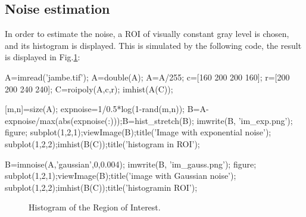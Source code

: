 \subsection{Noise estimation}
In order to estimate the noise, a ROI of visually constant gray level is chosen, and its histogram is displayed. This is simulated by the following code, the result is displayed in Fig.\ref{fig:image_restoration_denoising:matlab:histogram_roi}:

\begin{matlab}
A=imread('jambe.tif');
A=double(A);
A=A/255;
c=[160 200 200 160];
r=[200 200 240 240];
C=roipoly(A,c,r);
imhist(A(C));

[m,n]=size(A);
expnoise=1/0.5*log(1-rand(m,n));
B=A-expnoise/max(abs(expnoise(:)));B=hist_stretch(B);
imwrite(B, 'im_exp.png');
figure;
subplot(1,2,1);viewImage(B);title('Image with exponential noise');
subplot(1,2,2);imhist(B(C));title('histogram in ROI');

B=imnoise(A,'gaussian',0,0.004);
imwrite(B, 'im_gauss.png');
figure;
subplot(1,2,1);viewImage(B);title('image with Gaussian noise');
subplot(1,2,2);imhist(B(C));title('histogramin ROI');
\end{matlab}

\begin{figure}[htbp]
\centering
{} \hfill
{}
 \caption{Histogram of the Region of Interest.}
 \label{fig:image_restoration_denoising:matlab:histogram_roi}
\end{figure}


